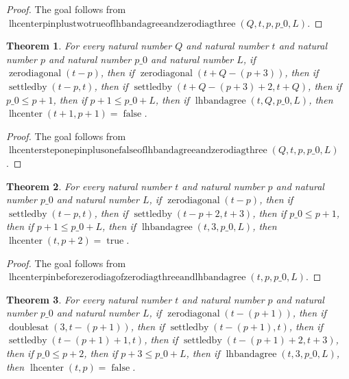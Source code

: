 \documentclass[11pt]{article}
\newtheorem{theorem}{Theorem}[section]
\theoremstyle{definition}
\begin{document}
\begin{proof}
The goal follows from \(\operatorname{lhcenterpinplustwotrueoflhbandagreeandzerodiagthree}(Q, t, p, p\_0, L)\).
\end{proof}
\begin{theorem}
\label{ll:paper:lhcenter-step-one-pin-plus-one-false-of-lhbandagree-and-zero-diag-three}
For every natural number \(Q\) and natural number \(t\) and natural number \(p\) and natural number \(p\_0\) and natural number \(L\), if \(\operatorname{zerodiagonal}(t - p)\), then if \(\operatorname{zerodiagonal}(t + Q - (p + 3))\), then if \(\operatorname{settledby}(t - p, t)\), then if \(\operatorname{settledby}(t + Q - (p + 3) + 2, t + Q)\), then if \(p\_0 \le p + 1\), then if \(p + 1 \le p\_0 + L\), then if \(\operatorname{lhbandagree}(t, Q, p\_0, L)\), then \(\operatorname{lhcenter}(t + 1, p + 1) = \operatorname{false}\).
\end{theorem}
\begin{proof}
The goal follows from \(\operatorname{lhcentersteponepinplusonefalseoflhbandagreeandzerodiagthree}(Q, t, p, p\_0, L)\).
\end{proof}
\begin{theorem}
\label{ll:paper:lhcenter-pin-before-zero-diag-of-zero-diag-three-and-lhbandagree}
For every natural number \(t\) and natural number \(p\) and natural number \(p\_0\) and natural number \(L\), if \(\operatorname{zerodiagonal}(t - p)\), then if \(\operatorname{settledby}(t - p, t)\), then if \(\operatorname{settledby}(t - p + 2, t + 3)\), then if \(p\_0 \le p + 1\), then if \(p + 1 \le p\_0 + L\), then if \(\operatorname{lhbandagree}(t, 3, p\_0, L)\), then \(\operatorname{lhcenter}(t, p + 2) = \operatorname{true}\).
\end{theorem}
\begin{proof}
The goal follows from \(\operatorname{lhcenterpinbeforezerodiagofzerodiagthreeandlhbandagree}(t, p, p\_0, L)\).
\end{proof}
\begin{theorem}
\label{ll:paper:lhcenter-pin-doubling-diag-false-of-doubles-three-and-lhbandagree}
For every natural number \(t\) and natural number \(p\) and natural number \(p\_0\) and natural number \(L\), if \(\operatorname{zerodiagonal}(t - (p + 1))\), then if \(\operatorname{doublesat}(3, t - (p + 1))\), then if \(\operatorname{settledby}(t - (p + 1), t)\), then if \(\operatorname{settledby}(t - (p + 1) + 1, t)\), then if \(\operatorname{settledby}(t - (p + 1) + 2, t + 3)\), then if \(p\_0 \le p + 2\), then if \(p + 3 \le p\_0 + L\), then if \(\operatorname{lhbandagree}(t, 3, p\_0, L)\), then \(\operatorname{lhcenter}(t, p) = \operatorname{false}\).
\end{theorem}
\end{document}
